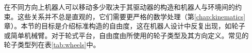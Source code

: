 在不同方向上机器人可以移动多少取决于其驱动器的构造和机器人与环境间的约束。这些关系并不总是直观的，它们需要更严格的数学处理（第\ref{chap:kinematics}章）。本节的目标是介绍标准构造的自由度，这在机器人设计中反复出现，如轮子或简单机械臂。对于轮式平台，自由度由所使用的轮子类型及其方向定义。常见的轮子类型列在表\ref{tab:wheels}中。


